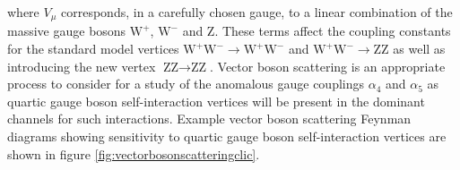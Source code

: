 \noindent where $V_{\mu}$ corresponds, in a carefully chosen gauge, to a linear combination of the massive gauge bosons $\text{W}^{+}$, $\text{W}^{-}$ and Z.  These terms affect the coupling constants for the standard model vertices $\text{W}^{+}\text{W}^{-} \rightarrow \text{W}^{+}\text{W}^{-}$ and $\text{W}^{+}\text{W}^{-} \rightarrow \text{Z}\text{Z}$ as well as introducing the new vertex $\text{Z}\text{Z} \rightarrow \text{Z}\text{Z}$.  Vector boson scattering is an appropriate process to consider for a study of the anomalous gauge couplings $\alpha_{4}$ and $\alpha_{5}$ as quartic gauge boson self-interaction vertices will be present in the dominant channels for such interactions.  Example vector boson scattering Feynman diagrams showing sensitivity to quartic gauge boson self-interaction vertices are shown in figure \ref{fig:vectorbosonscatteringclic}. 
